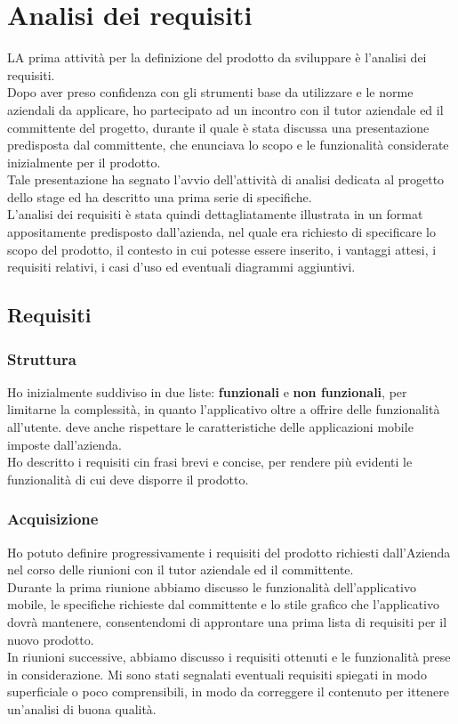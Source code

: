 \newpage
\chapter{Analisi dei requisiti}
\label{cap:analisi-requisiti}
LA prima attività per la definizione del prodotto da sviluppare è l'analisi dei requisiti. \\
Dopo aver preso confidenza con gli strumenti base da utilizzare e le norme aziendali da applicare, ho partecipato ad un incontro con il tutor aziendale ed il committente del progetto, durante il quale è stata discussa una presentazione predisposta dal committente, che enunciava lo scopo e le funzionalità considerate inizialmente per il prodotto. \\
Tale presentazione ha segnato l'avvio dell'attività di analisi dedicata al progetto dello stage ed ha descritto una prima serie di specifiche. \\
L'analisi dei requisiti è stata quindi dettagliatamente illustrata in un format appositamente predisposto dall'azienda, nel quale era richiesto di specificare lo scopo del prodotto, il contesto in cui potesse essere inserito, i vantaggi attesi, i requisiti relativi, i casi d'uso ed eventuali diagrammi aggiuntivi.
\section{Requisiti}
\subsection{Struttura}
Ho inizialmente suddiviso in due liste: \textbf{funzionali} e \textbf{non funzionali}, per limitarne la complessità, in quanto l'applicativo oltre a offrire delle funzionalità all'utente. deve anche rispettare le caratteristiche delle applicazioni mobile imposte dall'azienda. \\
Ho descritto i requisiti cin frasi brevi e concise, per rendere più evidenti le funzionalità di cui deve disporre il prodotto. \\
\subsection{Acquisizione}
Ho potuto definire progressivamente i requisiti del prodotto richiesti dall'Azienda nel corso delle riunioni con il tutor aziendale ed il committente. \\
Durante la prima riunione abbiamo discusso le funzionalità dell'applicativo mobile, le specifiche richieste dal committente e lo stile grafico che l'applicativo dovrà mantenere, consentendomi di approntare una prima lista di requisiti per il nuovo prodotto. \\
In riunioni successive, abbiamo discusso i requisiti ottenuti e le funzionalità prese in considerazione. Mi sono stati segnalati eventuali requisiti spiegati in modo superficiale o poco comprensibili, in modo da correggere il contenuto per ittenere un'analisi di buona qualità.
